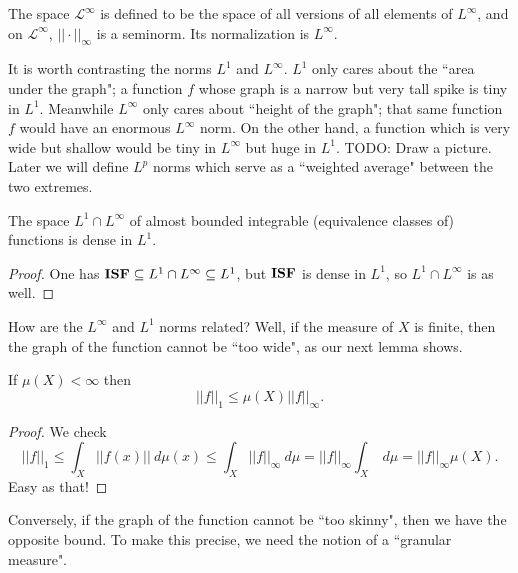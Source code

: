 \begin{subsec}
The space $\mathcal L^\infty$ is defined to be the space of all versions of all elements of $L^\infty$, and on $\mathcal L^\infty$, $||\cdot||_\infty$ is a seminorm. Its normalization is $L^\infty$.
\end{subsec}

\begin{subsec}
It is worth contrasting the norms $L^1$ and $L^\infty$. $L^1$ only cares about the ``area under the graph"; a function $f$ whose graph is a narrow but very tall spike is tiny in $L^1$. Meanwhile $L^\infty$ only cares about ``height of the graph"; that same function $f$ would have an enormous $L^\infty$ norm.
On the other hand, a function which is very wide but shallow would be tiny in $L^\infty$ but huge in $L^1$. TODO: Draw a picture.
Later we will define $L^p$ norms which serve as a ``weighted average" between the two extremes.
\end{subsec}

\begin{lemma}
The space $L^1 \cap L^\infty$ of almost bounded integrable (equivalence classes of) functions is dense in $L^1$.
\end{lemma}
\begin{proof}
One has $\mathbf{ISF} \subseteq L^1 \cap L^\infty \subseteq L^1$, but $\mathbf{ISF}$ is dense in $L^1$, so $L^1 \cap L^\infty$ is as well.
\end{proof}

\begin{subsec}
How are the $L^\infty$ and $L^1$ norms related?
Well, if the measure of $X$ is finite, then the graph of the function cannot be ``too wide", as our next lemma shows.
\end{subsec}

\begin{lemma}
If $\mu(X) < \infty$ then
$$||f||_1 \leq \mu(X) ||f||_\infty.$$
\end{lemma}
\begin{proof}
We check
$$||f||_1 \leq \int_X ||f(x)||~d\mu(x) \leq \int_X ||f||_\infty ~d\mu = ||f||_\infty \int_X ~d\mu = ||f||_\infty \mu(X).$$
Easy as that!
\end{proof}

\begin{subsec}
Conversely, if the graph of the function cannot be ``too skinny", then we have the opposite bound.
To make this precise, we need the notion of a ``granular measure".
\end{subsec}

